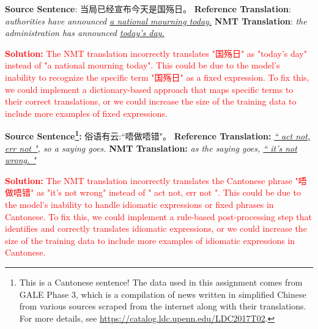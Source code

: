 \begin{parts}
\begin{subparts}
        \subpart[2]
        \textbf{Source Sentence}: 当局已经宣布今天是国殇日。 \newline
        \textbf{Reference Translation}: \textit{authorities have announced \underline{a national mourning today.}}\newline
        \textbf{NMT Translation}: \textit{the administration has announced \underline{today's day.}}
        
        \textcolor{red}{\textbf{Solution: } The NMT translation incorrectly translates "国殇日" as "today's day" instead of "a national mourning today". This could be due to the model's inability to recognize the specific term "国殇日" as a fixed expression. To fix this, we could implement a dictionary-based approach that maps specific terms to their correct translations, or we could increase the size of the training data to include more examples of fixed expressions.}
        
        
        \subpart[2] 
        \textbf{Source Sentence\footnote{This is a Cantonese sentence! The data used in this assignment comes from GALE Phase 3, which is a compilation of news written in simplified Chinese from various sources scraped from the internet along with their translations. For more details, see \url{https://catalog.ldc.upenn.edu/LDC2017T02}. }:} 俗语有云:``唔做唔错"。\newline
        \textbf{Reference Translation:} \textit{\underline{`` act not, err not "}, so a saying goes.}\newline
        \textbf{NMT Translation:} \textit{as the saying goes, \underline{`` it's not wrong. "}}

        \textcolor{red}{\textbf{Solution: } The NMT translation incorrectly translates the Cantonese phrase "唔做唔错" as "it's not wrong" instead of " act not, err not ". This could be due to the model's inability to handle idiomatic expressions or fixed phrases in Cantonese. To fix this, we could implement a rule-based post-processing step that identifies and correctly translates idiomatic expressions, or we could increase the size of the training data to include more examples of idiomatic expressions in Cantonese.}
        
        
    \end{subparts}



\end{parts}
